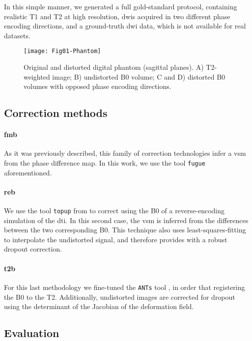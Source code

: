 In this simple manner, we generated a full gold-standard
protocol, containing realistic T1 and T2
at high resolution, \glspl*{dwi} acquired in two
different phase encoding directions, and a ground-truth
\gls*{dwi} data, which is not available for real datasets.


\begin{figure}[thpb]
   \centering
   \texttt{[image: Fig01-Phantom]}
   \caption{Original and distorted digital phantom (sagittal
   planes). A) T2-weighted image; B) undistorted B0 volume;
   C and D) distorted B0 volumes with opposed phase encoding 
   directions.}
   \label{fig:label}
\end{figure}

\subsection{Correction methods}

\paragraph*{\Gls*{fmb}} As it was previously described,
this family of correction technologies infer a \gls*{vsm}
from the phase difference map. In this work, we use the
tool \texttt{fugue} \cite{jenkinson_fsl_2012} aforementioned.

\paragraph*{\Gls*{reb}} We use the tool
\texttt{topup} from \cite{jenkinson_fsl_2012} to correct
using the B0 of a reverse-encoding simulation of the \gls*{dti}.
In this second case, the \gls*{vsm} is inferred from the
differences between the two corresponding B0. This technique
also uses least-squares-fitting to interpolate the undistorted
signal, and therefore provides with a robust dropout correction.

\paragraph*{\Gls*{t2b}} For this last methodology
we fine-tuned the \texttt{ANTs} tool \cite{avants_ants:_2013},
in order that registering the B0 to the T2. Additionally,
undistorted images are corrected for dropout using the determinant
of the Jacobian of the deformation field.

\subsection{Evaluation}

